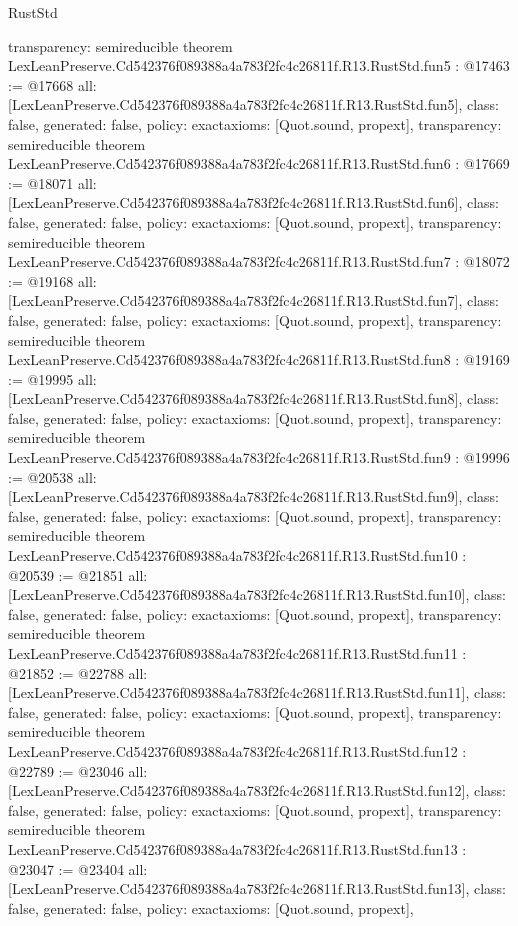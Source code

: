 \begin{lexlean}{RustStd}
\begin{coremodule}
{  transparency: semireducible
}
theorem LexLeanPreserve.Cd542376f089388a4a783f2fc4c26811f.R13.RustStd.fun5 : @17463 := @17668 {
  all: [LexLeanPreserve.Cd542376f089388a4a783f2fc4c26811f.R13.RustStd.fun5],
  class: false,
  generated: false,
  policy: exact{axioms: [Quot.sound, propext]},
  transparency: semireducible
}
theorem LexLeanPreserve.Cd542376f089388a4a783f2fc4c26811f.R13.RustStd.fun6 : @17669 := @18071 {
  all: [LexLeanPreserve.Cd542376f089388a4a783f2fc4c26811f.R13.RustStd.fun6],
  class: false,
  generated: false,
  policy: exact{axioms: [Quot.sound, propext]},
  transparency: semireducible
}
theorem LexLeanPreserve.Cd542376f089388a4a783f2fc4c26811f.R13.RustStd.fun7 : @18072 := @19168 {
  all: [LexLeanPreserve.Cd542376f089388a4a783f2fc4c26811f.R13.RustStd.fun7],
  class: false,
  generated: false,
  policy: exact{axioms: [Quot.sound, propext]},
  transparency: semireducible
}
theorem LexLeanPreserve.Cd542376f089388a4a783f2fc4c26811f.R13.RustStd.fun8 : @19169 := @19995 {
  all: [LexLeanPreserve.Cd542376f089388a4a783f2fc4c26811f.R13.RustStd.fun8],
  class: false,
  generated: false,
  policy: exact{axioms: [Quot.sound, propext]},
  transparency: semireducible
}
theorem LexLeanPreserve.Cd542376f089388a4a783f2fc4c26811f.R13.RustStd.fun9 : @19996 := @20538 {
  all: [LexLeanPreserve.Cd542376f089388a4a783f2fc4c26811f.R13.RustStd.fun9],
  class: false,
  generated: false,
  policy: exact{axioms: [Quot.sound, propext]},
  transparency: semireducible
}
theorem LexLeanPreserve.Cd542376f089388a4a783f2fc4c26811f.R13.RustStd.fun10 : @20539 := @21851 {
  all: [LexLeanPreserve.Cd542376f089388a4a783f2fc4c26811f.R13.RustStd.fun10],
  class: false,
  generated: false,
  policy: exact{axioms: [Quot.sound, propext]},
  transparency: semireducible
}
theorem LexLeanPreserve.Cd542376f089388a4a783f2fc4c26811f.R13.RustStd.fun11 : @21852 := @22788 {
  all: [LexLeanPreserve.Cd542376f089388a4a783f2fc4c26811f.R13.RustStd.fun11],
  class: false,
  generated: false,
  policy: exact{axioms: [Quot.sound, propext]},
  transparency: semireducible
}
theorem LexLeanPreserve.Cd542376f089388a4a783f2fc4c26811f.R13.RustStd.fun12 : @22789 := @23046 {
  all: [LexLeanPreserve.Cd542376f089388a4a783f2fc4c26811f.R13.RustStd.fun12],
  class: false,
  generated: false,
  policy: exact{axioms: [Quot.sound, propext]},
  transparency: semireducible
}
theorem LexLeanPreserve.Cd542376f089388a4a783f2fc4c26811f.R13.RustStd.fun13 : @23047 := @23404 {
  all: [LexLeanPreserve.Cd542376f089388a4a783f2fc4c26811f.R13.RustStd.fun13],
  class: false,
  generated: false,
  policy: exact{axioms: [Quot.sound, propext]},
}
\end{coremodule}
\end{lexlean}
